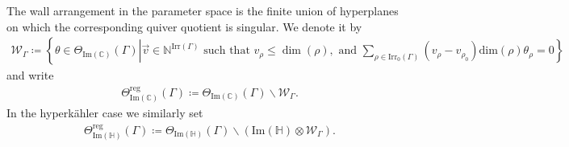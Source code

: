 \documentclass[psamsfonts]{amsart}
\theoremstyle{plain}
\theoremstyle{definition}{
\newtheorem{defi}{Definition}[section]
\newtheorem{ass}{Assumption}
\newtheorem*{nota}{Notation}}
\theoremstyle{remark}{
\newtheorem{rem}{Remark}
\newtheorem{ex}{Example}}
\theoremstyle{plain}{
\newtheorem{thm}{Theorem}[section]
\newtheorem{lem}{Lemma}[section]
\newtheorem{cor}{Corollary}[section]
\newtheorem{prop}{Proposition}[section]
\newtheorem{con}{Conjecture}[section]}
\newcommand{\m}[1]{{\mathrm{#1}}}
\begin{document}
The wall arrangement in the parameter space is the finite union of hyperplanes on which the corresponding quiver quotient is singular. We denote it by
    \begin{align*}
        \mathcal{W}_\Gamma\coloneqq \left\{\theta\in \Theta_{\m{Im}(\mathbb{C})}(\Gamma)\left|\vec{v}\in \mathbb{N}^{\m{Irr}(\Gamma)}\text{ such that }v_\rho\leq \dim(\rho),\text{ and }\sum_{\rho\in \m{Irr}_0(\Gamma)}(v_{\rho}-v_{\rho_0})\m{dim}(\rho)\theta_\rho=0\right.\right\}
    \end{align*}
and write
\begin{align*}
\Theta^{\m{reg}}_{\m{Im}(\mathbb{C})}(\Gamma)
\coloneqq
\Theta_{\m{Im}(\mathbb{C})}(\Gamma)\backslash \mathcal{W}_\Gamma .
\end{align*}
In the hyperkähler case we similarly set
\begin{align*}
\Theta^{\m{reg}}_{\m{Im}(\mathbb{H})}(\Gamma)
\coloneqq\Theta_{\m{Im}(\mathbb{H})}(\Gamma)\backslash
(\m{Im}(\mathbb{H})\otimes \mathcal{W}_\Gamma).
\end{align*}



    
        
\end{document}

